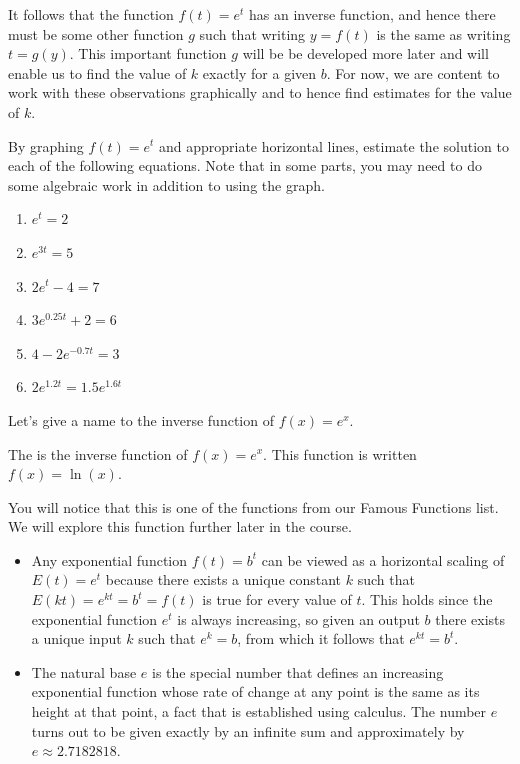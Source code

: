 \documentclass[nooutcomes]{ximera}
\begin{document}
It follows that the function $f(t) = e^t$ has an inverse function, and hence there must be some other function $g$ such that writing $y = f(t)$ is the same as writing $t = g(y)$.  This important function $g$ will be be developed more later and will enable us to find the value of $k$ exactly for a given $b$.  For now, we are content to work with these observations graphically and to hence find estimates for the value of $k$.

\begin{exploration}
By graphing $f(t) = e^t$ and appropriate horizontal lines, estimate the solution to each of the following equations.  Note that in some parts, you may need to do some algebraic work in addition to using the graph.
\begin{enumerate}[label=\alph*.]
\item $e^t = 2$
\item $e^{3t} = 5$
\item $2e^t - 4 = 7$
\item $3e^{0.25t} + 2 = 6$
\item $4 - 2e^{-0.7t} = 3$
\item $2e^{1.2t} = 1.5e^{1.6t}$
\end{enumerate}
\end{exploration}

Let's give a name to the inverse function of $f(x)=e^x$.

\begin{definition}
The  is the inverse function of $f(x)=e^x$.  This function is written $f(x)=\ln(x)$.
\end{definition}

You will notice that this is one of the functions from our Famous Functions list.  We will explore this function further later in the course.

\begin{summary}\begin{itemize}
\item Any exponential function $f(t) = b^t$ can be viewed as a horizontal scaling of $E(t) = e^t$ because there exists a unique constant $k$ such that $E(kt) = e^{kt} = b^t = f(t)$ is true for every value of $t$.  This holds since the exponential function $e^t$ is always increasing, so given an output $b$ there exists a unique input $k$ such that $e^k = b$, from which it follows that $e^{kt} = b^t$.
\item The natural base $e$ is the special number that defines an increasing exponential function whose rate of change at any point is the same as its height at that point, a fact that is established using calculus.  The number $e$ turns out to be given exactly by an infinite sum and approximately by $e \approx 2.7182818$.
\end{itemize}\end{summary}
\end{document}
